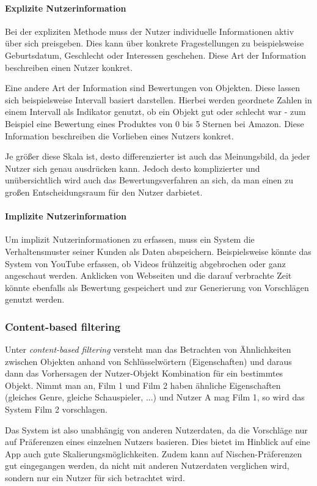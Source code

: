 \paragraph{Explizite Nutzerinformation}
Bei der expliziten Methode muss der Nutzer individuelle Informationen aktiv über sich preisgeben. Dies kann über konkrete Fragestellungen zu beispielsweise Geburtsdatum, Geschlecht oder Interessen geschehen. Diese Art der Information beschreiben einen Nutzer konkret. 

Eine andere Art der Information sind Bewertungen von Objekten. Diese lassen sich beispielsweise Intervall basiert darstellen. Hierbei werden geordnete Zahlen in einem Intervall als Indikator genutzt, ob ein Objekt gut oder schlecht war - zum Beispiel eine Bewertung eines Produktes von 0 bis 5 Sternen bei Amazon. Diese Information beschreiben die Vorlieben eines Nutzers konkret.

Je größer diese Skala ist, desto differenzierter ist auch das Meinungsbild, da jeder Nutzer sich genau ausdrücken kann. Jedoch desto komplizierter und unübersichtlich wird auch das Bewertungsverfahren an sich, da man einen zu großen Entscheidungsraum für den Nutzer darbietet.

\paragraph{Implizite Nutzerinformation}
Um implizit Nutzerinformationen zu erfassen, muss ein System die Verhaltensmuster seiner Kunden als Daten abspeichern. Beispielsweise könnte das System von YouTube erfassen, ob Videos frühzeitig abgebrochen oder ganz angeschaut werden. Anklicken von Webseiten und die darauf verbrachte Zeit könnte ebenfalls als Bewertung gespeichert und zur Generierung von Vorschlägen genutzt werden.

\subsubsection{Content-based filtering}
Unter \textit{content-based filtering} versteht man das Betrachten von Ähnlichkeiten zwischen Objekten anhand von Schlüsselwörtern (Eigenschaften) und daraus dann das Vorhersagen der Nutzer-Objekt Kombination für ein bestimmtes Objekt. 
Nimmt man an, Film 1 und Film 2 haben ähnliche Eigenschaften (gleiches Genre, gleiche Schauspieler, ...) und Nutzer A mag Film 1, so wird das System Film 2 vorschlagen.

Das System ist also unabhängig von anderen Nutzerdaten, da die Vorschläge nur auf Präferenzen eines einzelnen Nutzers basieren. Dies bietet im Hinblick auf eine App auch gute Skalierungsmöglichkeiten. Zudem kann auf Nischen-Präferenzen gut eingegangen werden, da nicht mit anderen Nutzerdaten verglichen wird, sondern nur ein Nutzer für sich betrachtet wird.

